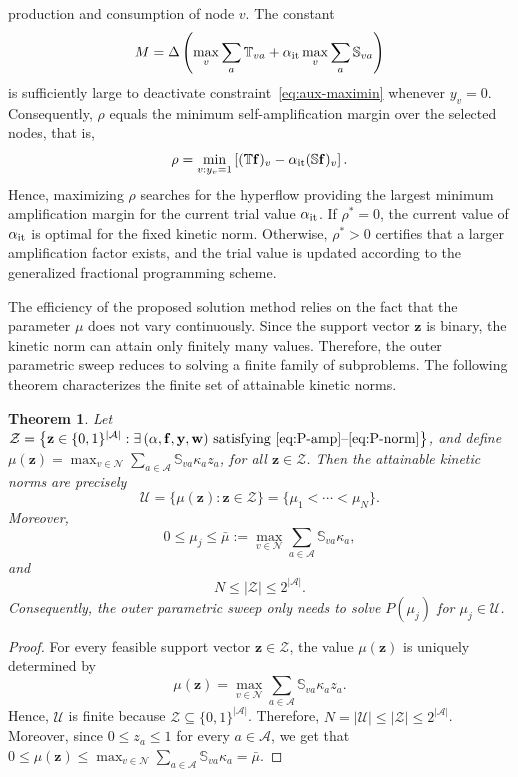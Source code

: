 \documentclass[a4paper,11pt,reqno]{amsart}
\newtheorem{theorem}[definition]{Theorem}
\begin{document}
production and consumption of node $v$. The constant
$$
M=
\Delta\left(
\max_v\sum_a\mathbb T_{va}
+
\alpha_{\rm it}
\max_v\sum_a\mathbb S_{va}
\right)
$$
is sufficiently large to deactivate
constraint~\eqref{eq:aux-maximin} whenever $y_v=0$. Consequently,
$\rho$ equals the minimum self-amplification margin over the selected nodes,
that is,
$$
\rho=
\min_{v:y_v=1}
\left[
(\mathbb T\mathbf f)_v
-
\alpha_{\rm it}
(\mathbb S\mathbf f)_v
\right].
$$
Hence, maximizing $\rho$ searches for the hyperflow providing the largest
minimum amplification margin for the current trial value
$\alpha_{\rm it}$. If $\rho^*=0$, the current value of
$\alpha_{\rm it}$ is optimal for the fixed kinetic norm.
Otherwise, $\rho^*>0$ certifies that a larger amplification factor exists, and
the trial value is updated according to the generalized fractional programming
scheme.

The efficiency of the proposed solution method relies on the fact that the
parameter $\mu$ does not vary continuously. Since the support vector
$\mathbf z$ is binary, the kinetic norm can attain only finitely many values.
Therefore, the outer parametric sweep reduces to solving a finite family of
subproblems. The following theorem characterizes the finite set of attainable kinetic norms.
\begin{theorem}
\label{thm:mu_values}
Let $\mathcal Z=
\left\{
\mathbf z\in\{0,1\}^{|\mathcal A|}:
\exists\,(\alpha,\mathbf f,\mathbf y,\mathbf w)
\text{ satisfying }
\eqref{eq:P-amp}\text{--}\eqref{eq:P-norm}
\right\}$, 
and define $
\mu(\mathbf z)=
\max_{v\in\mathcal N}
\sum_{a\in\mathcal A}
\mathbb S_{va}\kappa_a z_a$, for all
$\mathbf z\in\mathcal Z$. 
Then the attainable kinetic norms are precisely
$$
\mathcal U=
\{\mu(\mathbf z):\mathbf z\in\mathcal Z\}
=
\{\mu_1<\cdots<\mu_N\}.
$$
Moreover,
$$
0\le
\mu_j
\le
\bar\mu:=
\max_{v\in\mathcal N}
\sum_{a\in\mathcal A}
\mathbb S_{va}\kappa_a,
$$
and
$$
N\le |\mathcal Z|
\le
2^{|\mathcal A|}.
$$
Consequently, the outer parametric sweep only needs to solve
$P(\mu_j)$ for
$\mu_j\in\mathcal U$.
\end{theorem}
\begin{proof}
For every feasible support vector $\mathbf z\in\mathcal Z$, the value
$\mu(\mathbf z)$ is uniquely determined by
$$
\mu(\mathbf z)=
\max_{v\in\mathcal N}
\sum_{a\in\mathcal A}
\mathbb S_{va}\kappa_a z_a.
$$
Hence, $\mathcal U$ is finite because $\mathcal Z\subseteq\{0,1\}^{|\mathcal A|}$. Therefore,
$N=|\mathcal U|
\le
|\mathcal Z|
\le
2^{|\mathcal A|}$. 
Moreover, since $0\le z_a\le1$ for every $a\in\mathcal A$, we get that $
0
\le
\mu(\mathbf z)
\le
\max_{v\in\mathcal N}
\sum_{a\in\mathcal A}
\mathbb S_{va}\kappa_a
=
\bar\mu$.
\end{proof}
\end{document}
